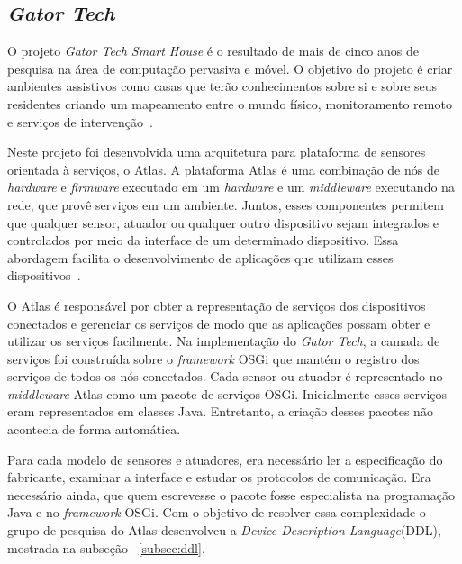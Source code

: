 \subsection{\emph{Gator Tech}}

O projeto \emph{Gator Tech Smart House} é o resultado de mais de cinco anos de pesquisa na área de computação pervasiva e móvel. O objetivo do projeto é criar ambientes assistivos como casas que terão conhecimentos sobre si e sobre seus residentes criando um mapeamento entre o mundo físico, monitoramento remoto e serviços de intervenção~\cite{gatorTech}.

Neste projeto foi desenvolvida uma arquitetura para plataforma de sensores orientada à serviços, o Atlas. A plataforma Atlas é uma combinação de nós de \emph{hardware} e \emph{firmware} executado em um \emph{hardware} e um \emph{middleware} executando na rede, que provê serviços em um ambiente. Juntos, esses componentes permitem que qualquer sensor, atuador ou qualquer outro dispositivo sejam integrados e controlados por meio da interface de um determinado dispositivo. Essa abordagem facilita o desenvolvimento de aplicações que utilizam esses dispositivos~\cite{gatorTechLessons}. 

O Atlas é responsável por obter a representação de serviços dos dispositivos conectados e gerenciar os serviços de modo que as aplicações possam obter e utilizar os serviços facilmente. Na implementação do \emph{Gator Tech}, a camada de serviços foi construída sobre o \emph{framework} OSGi que mantém o registro dos serviços de todos os nós conectados. Cada sensor ou atuador é representado no \emph{middleware} Atlas como um pacote de serviços OSGi. Inicialmente esses serviços eram representados em classes Java. Entretanto, a criação desses pacotes não acontecia de forma automática. 

Para cada modelo de sensores e atuadores, era necessário ler a especificação do fabricante, examinar a interface e estudar os protocolos de comunicação. Era necessário ainda, que quem escrevesse o pacote fosse especialista na programação Java e no \emph{framework} OSGi. Com o objetivo de resolver essa complexidade o grupo de pesquisa do Atlas desenvolveu a \emph{Device Description Language}(DDL), mostrada na subseção ~\ref{subsec:ddl}. 